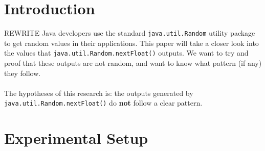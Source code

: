 \documentclass[
10pt, %
a4paper, %
oneside, %
headinclude,footinclude, %
BCOR5mm, %
]{scrartcl}
\begin{document}

\section{Introduction}

REWRITE
Java developers use the standard \texttt{java.util.Random} utility package to get random values in their applications. This paper will take a closer look into the values that \texttt{java.util.Random.nextFloat()} outputs. We want to try and proof that these outputs are not random, and want to know what pattern (if any) they follow.
\\
\\
The hypotheses of this research is: the outputs generated by \texttt{java.util.Random.nextFloat()} do \textbf{not} follow a clear pattern.
 

\section{Experimental Setup}
\end{document}

